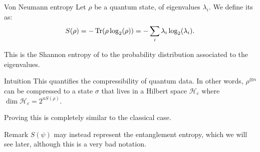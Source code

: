 \documentclass[a4paper]{article}
\begin{document}
\begin{parag}{Von Neumann entropy}
    Let $\rho$ be a quantum state, of eigenvalues $\lambda_i$. We define its  as: 
    \[S\left(\rho\right) = -\Tr\left(\rho \log_{2}\left(\rho\right)\right) = -\sum_{i} \lambda_i \log_2\left(\lambda_i\right).\]
    
    This is the Shannon entropy of to the probability distribution associated to the eigenvalues.

    \begin{subparag}{Intuition}
        This quantifies the compressibility of quantum data. In other words, $\rho^{\otimes n}$ can be compressed to a state $\sigma$ that lives in a Hilbert space $\mathcal{H}_c$ where $\dim \mathcal{H}_c = 2^{n S\left(\rho\right)}$.

        Proving this is completely similar to the classical case.
    \end{subparag}

    \begin{subparag}{Remark}
        $S\left(\psi\right)$ may instead represent the entanglement entropy, which we will see later, although this is a very bad notation.
    \end{subparag}
\end{parag}
\end{document}

